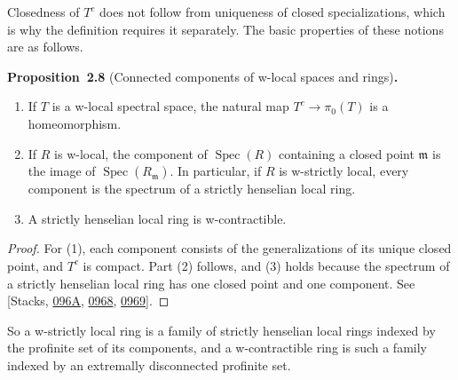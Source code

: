 \documentclass[11pt]{article}
\newenvironment{bpstatement}[2]{\par\addvspace{0.6\baselineskip}\noindent\textbf{#1}#2\textbf{.}\enspace\ignorespaces}
  {\par\addvspace{0.4\baselineskip}}
\newenvironment{bpstatementit}[2]{\begin{bpstatement}{#1}{#2}\itshape\ignorespaces}{\end{bpstatement}}
\begin{document}
\label{bp24}%
Closedness of \(T^c\) does not follow from uniqueness of closed specializations, which is why the definition requires it separately. The basic properties of these notions are as follows.

\label{bp25}%
\begin{bpstatementit}{Proposition~2.8}{ (Connected components of w-local spaces and rings)}
\begin{enumerate}
\item If \(T\) is a w-local spectral space, the natural map \(T^c\to\pi_0(T)\) is a homeomorphism.
\item If \(R\) is w-local, the component of \(\operatorname{Spec}(R)\) containing a closed point \(\mathfrak m\) is the image of \(\operatorname{Spec}(R_{\mathfrak m})\). In particular, if \(R\) is w-strictly local, every component is the spectrum of a strictly henselian local ring.
\item A strictly henselian local ring is w-contractible.
\end{enumerate}
\end{bpstatementit}

\begin{proof}[{Proof}]\label{bp26}%
For (1), each component consists of the generalizations of its unique closed point, and \(T^c\) is compact. Part (2) follows, and (3) holds because the spectrum of a strictly henselian local ring has one closed point and one component. See [Stacks, \href{https://stacks.math.columbia.edu/tag/096A}{096A}, \href{https://stacks.math.columbia.edu/tag/0968}{0968}, \href{https://stacks.math.columbia.edu/tag/0969}{0969}].
\end{proof}

\label{bp27}%
So a w-strictly local ring is a family of strictly henselian local rings indexed by the profinite set of its components, and a w-contractible ring is such a family indexed by an extremally disconnected profinite set.
\end{document}
